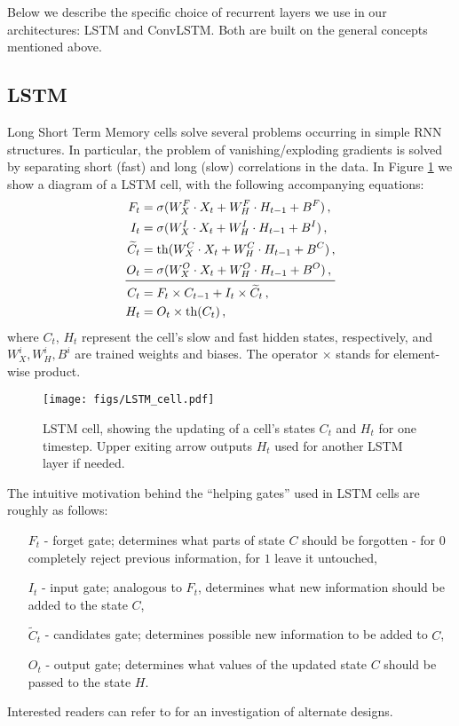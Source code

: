 \documentclass[fleqn,usenatbib]{mnras}
\begin{document}
Below we describe the specific choice of recurrent layers we use in our architectures: LSTM and ConvLSTM.  Both are built on the general concepts mentioned above.

\subsection{LSTM} \label{app:LSTM}
Long Short Term Memory cells \citep{LSTM} solve several problems occurring in simple RNN structures. In particular, the problem of vanishing/exploding gradients is solved by separating short (fast) and long (slow) correlations in the data. In Figure \ref{fig:LSTM_cell} we show a diagram of a LSTM cell, with the following accompanying equations:
\begin{equation}
\begin{aligned}
F_{t} &=\sigma (W^{F}_X \cdot X_{t} + W^F_H \cdot H_{t-1} + B^F) \, , \\
I_{t} &=\sigma(W^{I}_X \cdot X_t + W^I_H \cdot H_{t-1} + B^I )  \, ,\\
\widetilde{C}_{t} &=\operatorname{th} (W^{C}_X \cdot X_t + W^C_H \cdot H_{t-1} + B^{C} )  \, ,\\
O_{t} &=\sigma(W^{O}_X \cdot X_t + W^O_H \cdot H_{t-1}+ B^O)  \, , \\ 
\midrule
C_{t} &= F_{t} \times C_{t-1} + I_{t} \times \widetilde{C}_{t}  \, ,\\
H_{t} &=O_{t} \times \operatorname{th} ( C_{t}) \, ,
\end{aligned}
\end{equation}
where $C_t$, $H_t$ represent the cell's slow and fast hidden states, respectively, and ${W^i_X, W^i_H, B^i}$ are trained weights and biases. The operator $\times$ stands for element-wise product. 
\begin{figure}
    \centering
    \texttt{[image: figs/LSTM\_cell.pdf]}
    \caption{LSTM cell, showing the updating of a cell's states $C_t$ and $H_t$ for one timestep. Upper exiting arrow outputs $H_t$ used for another LSTM layer if needed.}
    \label{fig:LSTM_cell}
\end{figure}
The intuitive motivation behind the \enquote{helping gates} used in LSTM cells are roughly as follows:
\begin{itemize}
    \item[\boldmath$F_t$] - forget gate; determines what parts of state $C$ should be forgotten - for $0$ completely reject previous information, for $1$ leave it untouched,
    \item[\boldmath$I_t$] - input gate; analogous to $F_t$, determines what new information should be added to the state $C$,
    \item[\boldmath$\widetilde{C}_t$] - candidates gate; determines possible new information to be added to  $C$, 
    \item[\boldmath$O_t$] - output gate; determines what values of the updated state $C$ should be passed to the state $H$.
\end{itemize}
Interested readers can refer to \cite{jozefowicz2015empirical} for an investigation of alternate designs.
\end{document}
